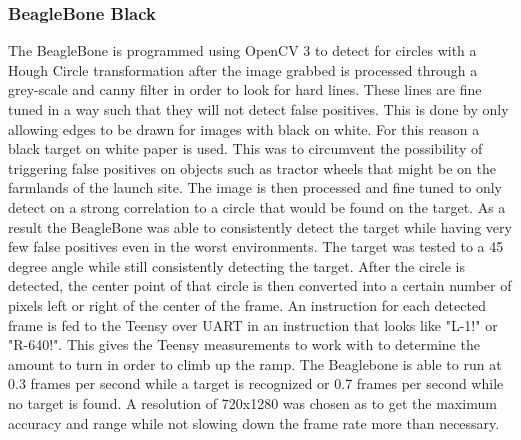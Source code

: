 \documentclass[journal,10pt,draftclsnofoot,onecolumn,compsoc]{IEEEtran} \usepackage[margin=0.75in]{geometry}
\begin{document}
\subsubsection{BeagleBone Black}
The BeagleBone is programmed using OpenCV 3 to detect for circles with a Hough Circle transformation after the image grabbed is processed through a grey-scale and canny filter in order to look for hard lines. These lines are fine tuned in a way such that they will not detect false positives. This is done by only allowing edges to be drawn for images with black on white. For this reason a black target on white paper is used. This was to circumvent the possibility of triggering false positives on objects such as tractor wheels that might be on the farmlands of the launch site. The image is then processed and fine tuned to only detect on a strong correlation to a circle that would be found on the target. As a result the BeagleBone was able to consistently detect the target while having very few false positives even in the worst environments. The target was tested to a 45 degree angle while still consistently detecting the target. After the circle is detected, the center point of that circle is then converted into a certain number of pixels left or right of the center of the frame. An instruction for each detected frame is fed to the Teensy over UART in an instruction that looks like "L-1!" or "R-640!". This gives the Teensy measurements to work with to determine the amount to turn in order to climb up the ramp. The Beaglebone is able to run at 0.3 frames per second while a target is recognized or 0.7 frames per second while no target is found. A resolution of 720x1280 was chosen as to get the maximum accuracy and range while not slowing down the frame rate more than necessary. 

\newpage

\vspace{0.5cm}
\end{document}
